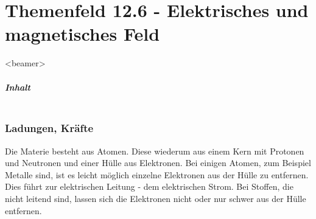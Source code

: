 \documentclass[aspectratio=169, ignorenonframetext]{beamer}
\begin{document}
\part{Themenfeld 12.6 - Elektrisches und magnetisches Feld}
\label{Teil_12_6}
\begin{frame}
  \partpage
\end{frame}

\begin{frame}
  \partpage
\end{frame}
\begin{frame}<beamer>
  \frametitle{Inhalt}

  \begin{columns}
    \tableofcontents[sections={7-12}]%
    \tableofcontents[sections={13-}]%
  \end{columns}

\end{frame}

\section{Ladungen, Kräfte}
Die Materie besteht aus Atomen. Diese wiederum aus einem Kern mit Protonen und Neutronen und einer Hülle aus Elektronen. Bei einigen Atomen, zum Beispiel Metalle sind, ist es leicht möglich einzelne Elektronen aus der Hülle zu entfernen. Dies führt zur elektrischen Leitung - dem elektrischen Strom. Bei Stoffen, die nicht leitend sind, lassen sich die Elektronen nicht oder nur schwer aus der Hülle entfernen.
\end{document}
